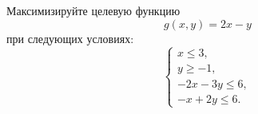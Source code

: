  Максимизируйте целевую функцию
\[ g(x, y)=2x-y \]
при следующих условиях:
\[
\begin{cases}
x \le 3,\\
y \ge -1,\\
-2x-3y \le 6,\\
-x+2y \le 6.
\end{cases}
\]
































